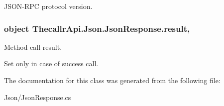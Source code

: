 J\+S\+O\+N-\/\+R\+P\+C protocol version. 

\hypertarget{class_thecallr_api_1_1_json_1_1_json_response_a4366a7a60d9781436d368ab499ec6ae8}{
\subsubsection[{result}]{\setlength{\rightskip}{0pt plus 5cm}object Thecallr\+Api.\+Json.\+Json\+Response.\+result\hspace{0.3cm}{\ttfamily [get]}, {\ttfamily [set]}}}\label{class_thecallr_api_1_1_json_1_1_json_response_a4366a7a60d9781436d368ab499ec6ae8}


Method call result. 

Set only in case of success call.

The documentation for this class was generated from the following file\+:\begin{DoxyCompactItemize}
\item 
Json/Json\+Response.\+cs\end{DoxyCompactItemize}
